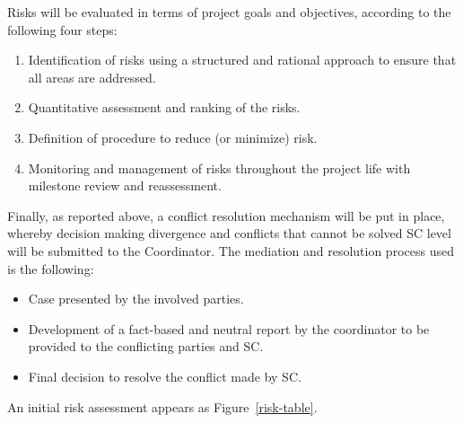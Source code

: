 Risks will be evaluated in terms of project goals and objectives,
according to the following four steps:
\begin{enumerate}
\item Identification of risks using a structured and rational approach to
ensure that all areas are addressed.
\item Quantitative assessment and ranking of the risks.
\item Definition of procedure to reduce (or minimize) risk.
\item Monitoring and management of risks throughout the project life
with milestone review and reassessment.
\end{enumerate}

Finally, as reported above, a conflict resolution mechanism will be put in place,
whereby decision making divergence and conflicts that cannot be solved
SC level will be submitted to the Coordinator. The
mediation and resolution process used is the following:
\begin{itemize}
\item Case presented by the involved parties.
\item Development of a fact-based and neutral report by the coordinator
to be provided to the conflicting parties and SC.
\item Final decision to resolve the conflict made by SC.
\end{itemize}

\ifgrantagreement\else
An initial risk assessment appears as Figure~\ref{risk-table}.


